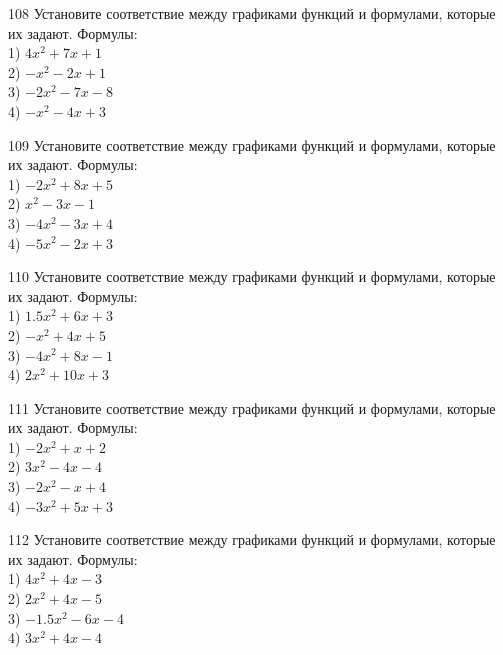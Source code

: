 \documentclass[4apaper]{article}
\begin{document}
\begin{taskBN}{108}
Установите соответствие между графиками функций и формулами, которые их задают. Формулы: \\1) $4x^2+7x+1$\\2) $-x^2-2x+1$\\3) $-2x^2-7x-8$\\4) $-x^2-4x+3$
\end{taskBN}

\begin{taskBN}{109}
Установите соответствие между графиками функций и формулами, которые их задают. Формулы: \\1) $-2x^2+8x+5$\\2) $x^2-3x-1$\\3) $-4x^2-3x+4$\\4) $-5x^2-2x+3$
\end{taskBN}

\begin{taskBN}{110}
Установите соответствие между графиками функций и формулами, которые их задают. Формулы: \\1) $1.5x^2+6x+3$\\2) $-x^2+4x+5$\\3) $-4x^2+8x-1$\\4) $2x^2+10x+3$
\end{taskBN}

\begin{taskBN}{111}
Установите соответствие между графиками функций и формулами, которые их задают. Формулы: \\1) $-2x^2+x+2$\\2) $3x^2-4x-4$\\3) $-2x^2-x+4$\\4) $-3x^2+5x+3$
\end{taskBN}

\begin{taskBN}{112}
Установите соответствие между графиками функций и формулами, которые их задают. Формулы: \\1) $4x^2+4x-3$\\2) $2x^2+4x-5$\\3) $-1.5x^2-6x-4$\\4) $3x^2+4x-4$
\end{taskBN}
\end{document}
